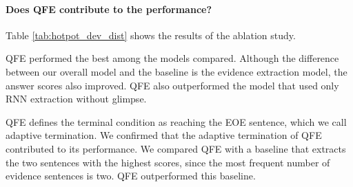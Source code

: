 \documentclass[11pt,a4paper]{article}
\theoremstyle{definition}
\begin{document}
	\paragraph{Does QFE contribute to the performance?}
	\begin{table}[t]
	\begin{center}
\caption{Performance of our models and the baseline models on the development set in the distractor setting.
		}\label{tab:hotpot_dev_dist} \end{center}
	\end{table}
    
	Table \ref{tab:hotpot_dev_dist} shows the results of the ablation study. 

	QFE performed the best among the models compared. Although the difference between our overall model and the baseline is the evidence extraction model, the answer scores also improved. 
	QFE also outperformed the model that used only RNN extraction without glimpse.
	
	QFE defines the terminal condition as reaching the EOE sentence, which we call adaptive termination.
	We confirmed that the adaptive termination of QFE contributed to its performance. We compared QFE with a baseline that extracts the two sentences with the highest scores, since the most frequent number of evidence sentences is two. QFE outperformed this baseline. 
	
\end{document}
